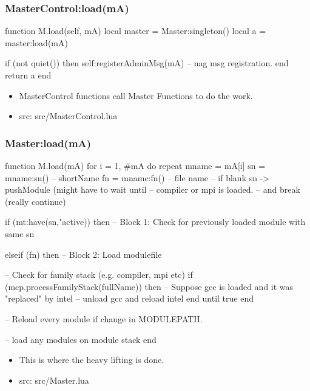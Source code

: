 \documentclass{beamer}
\begin{document}
\begin{frame}[fragile]
\begin{frame}[fragile]
    \frametitle{MasterControl:load(mA)}
 {\tiny
    \begin{semiverbatim}
function M.load(self, mA)
   local master = Master:singleton()
   local a      = master:load(mA)

   if (not quiet()) then
      self:registerAdminMsg(mA) -- nag msg registration.
   end
   return a
end
    \end{semiverbatim}
}
  \begin{itemize}
    \item MasterControl functions call Master Functions to do the work.
    \item src: src/MasterControl.lua
  \end{itemize}
\end{frame}

\begin{frame}[fragile]
    \frametitle{Master:load(mA)}
 {\tiny
    \begin{semiverbatim}
function M.load(mA)
  for i = 1, #mA do
     repeat
        mname = mA[i]
        sn = mname:sn()  -- shortName
        fn = mname:fn()  -- file name
        -- if blank sn -> pushModule (might have to wait until
        -- compiler or mpi is loaded.
        -- and break (really continue)

        if (mt:have(sn,"active)) then
           -- Block 1: Check for previously loaded module with same sn

        elseif (fn) then
           -- Block 2: Load modulefile

        -- Check for family stack (e.g. compiler, mpi etc)
        if (mcp.processFamilyStack(fullName)) then
            -- Suppose gcc is loaded and it was "replaced" by intel
            -- unload gcc and reload intel
         end
      until true
   end         
     
   -- Reload every module if change in MODULEPATH.
     
   -- load any modules on module stack
end
    \end{semiverbatim}
}
  \begin{itemize}
    \item This is where the heavy lifting is done.
    \item src: src/Master.lua
  \end{itemize}

\end{frame}


\end{frame}
\end{document}
